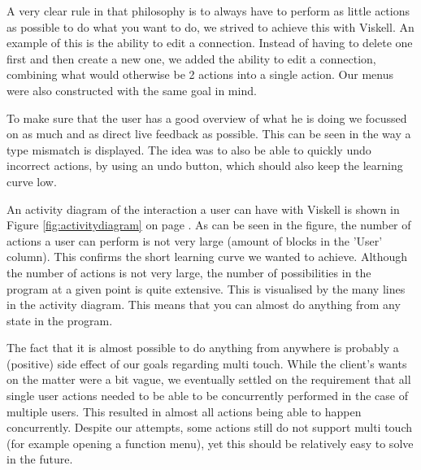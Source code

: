 A very clear rule in that philosophy is to always have to perform as little actions as possible to do what you want to do, we strived to achieve this with Viskell. An example of this is the ability to edit a connection. Instead of having to delete one first and then create a new one, we added the ability to edit a connection, combining what would otherwise be 2 actions into a single action. Our menus were also constructed with the same goal in mind.

To make sure that the user has a good overview of what he is doing we focussed on as much and as direct live feedback as possible. This can be seen in the way a type mismatch is displayed. The idea was to also be able to quickly undo incorrect actions, by using an undo button, which should also keep the learning curve low.

An activity diagram of the interaction a user can have with Viskell is shown in Figure \ref{fig:activitydiagram} on page \pageref{fig:activitydiagram}. As can be seen in the figure, the number of actions a user can perform is not very large (amount of blocks in the 'User' column). This confirms the short learning curve we wanted to achieve. Although the number of actions is not very large, the number of possibilities in the program at a given point is quite extensive. This is visualised by the many lines in the activity diagram. This means that you can almost do anything from any state in the program.

The fact that it is almost possible to do anything from anywhere is probably a (positive) side effect of our goals regarding multi touch. While the client's wants on the matter were a bit vague, we eventually settled on the requirement that all single user actions needed to be able to be concurrently performed in the case of multiple users. This resulted in almost all actions being able to happen concurrently. Despite our attempts, some actions still do not support multi touch (for example opening a function menu), yet this should be relatively easy to solve in the future.





